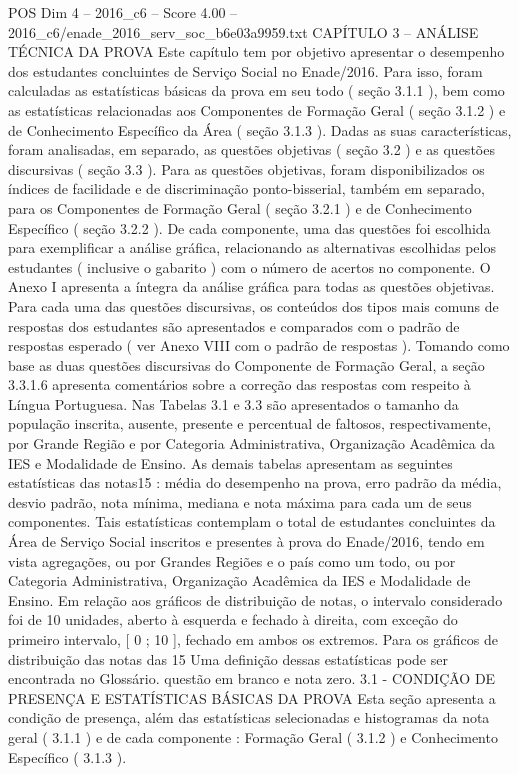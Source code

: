 \begin{textsample}{POS Dim 4 – 2016\_c6 – Score 4.00 – 2016\_c6/enade\_2016\_serv\_soc\_b6e03a9959.txt}  \label{ex:f4_pos_057}
CAPÍTULO 3 – ANÁLISE TÉCNICA DA PROVA Este capítulo tem por objetivo apresentar o desempenho dos estudantes concluintes de Serviço Social no Enade/2016.
Para isso, foram calculadas as estatísticas básicas da prova em seu todo ( seção 3.1.1 ), bem como as estatísticas relacionadas aos Componentes de Formação Geral ( seção 3.1.2 ) e de Conhecimento Específico da Área ( seção 3.1.3 ).
Dadas as suas características, foram analisadas, em separado, as questões objetivas ( seção 3.2 ) e as questões discursivas ( seção 3.3 ).
Para as questões objetivas, foram disponibilizados os índices de facilidade e de discriminação ponto-bisserial, também em separado, para os Componentes de Formação Geral ( seção 3.2.1 ) e de Conhecimento Específico ( seção 3.2.2 ).
De cada componente, uma das questões foi escolhida para exemplificar a análise gráfica, relacionando as alternativas escolhidas pelos estudantes ( inclusive o gabarito ) com o número de acertos no componente.
O Anexo I apresenta a íntegra da análise gráfica para todas as questões objetivas.
Para cada uma das questões discursivas, os conteúdos dos tipos mais comuns de respostas dos estudantes são apresentados e comparados com o padrão de respostas esperado ( ver Anexo VIII com o padrão de respostas ).
Tomando como base as duas questões discursivas do Componente de Formação Geral, a seção 3.3.1.6 apresenta comentários sobre a correção das respostas com respeito à Língua Portuguesa.
Nas Tabelas 3.1 e 3.3 são apresentados o tamanho da população inscrita, ausente, presente e percentual de faltosos, respectivamente, por Grande Região e por Categoria Administrativa, Organização Acadêmica da IES e Modalidade de Ensino.
As demais tabelas apresentam as seguintes estatísticas das notas15 : média do desempenho na prova, erro padrão da média, desvio padrão, nota mínima, mediana e nota máxima para cada um de seus componentes.
Tais estatísticas contemplam o total de estudantes concluintes da Área de Serviço Social inscritos e presentes à prova do Enade/2016, tendo em vista agregações, ou por Grandes Regiões e o país como um todo, ou por Categoria Administrativa, Organização Acadêmica da IES e Modalidade de Ensino.
Em relação aos gráficos de distribuição de notas, o intervalo considerado foi de 10 unidades, aberto à esquerda e fechado à direita, com exceção do primeiro intervalo, [ 0 ; 10 ], fechado em ambos os extremos.
Para os gráficos de distribuição das notas das 15 Uma definição dessas estatísticas pode ser encontrada no Glossário. questão em branco e nota zero. 3.1 - CONDIÇÃO DE PRESENÇA E ESTATÍSTICAS BÁSICAS DA PROVA Esta seção apresenta a condição de presença, além das estatísticas selecionadas e histogramas da nota geral ( 3.1.1 ) e de cada componente : Formação Geral ( 3.1.2 ) e Conhecimento Específico ( 3.1.3 ).

\end{textsample}
